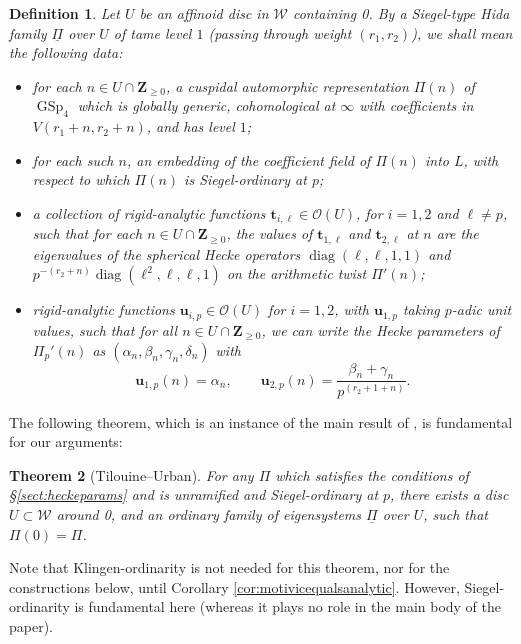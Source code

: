 \documentclass[cjm]{ipart}
\theoremstyle{plain}
\newtheorem{theorem}{Theorem}[subsection]
\newtheorem{definition}[theorem]{Definition}
\theoremstyle{remark}
\DeclareMathOperator{\diag}{diag}
\DeclareMathOperator{\GSp}{GSp}
\newcommand{\ZZ}{\mathbf{Z}}
\newcommand{\cO}{\mathcal{O}}
\newcommand{\cW}{\mathcal{W}}
\newcommand{\uPi}{\underline{\Pi}}
\numberwithin{equation}{subsection}
\renewcommand{\ge}{\geqslant}
\begin{document}
  \begin{definition}
   \label{def:family}
   Let $U$ be an affinoid disc in $\cW$ containing 0. By a \emph{Siegel-type Hida family} $\uPi$ over $U$ of tame level $1$ (passing through weight $(r_1, r_2)$), we shall mean the following data:
   \begin{itemize}
    \item for each $n \in U \cap \ZZ_{\ge 0}$, a cuspidal automorphic representation $\Pi(n)$ of $\GSp_4$ which is globally generic, cohomological at $\infty$ with coefficients in $V(r_1 + n, r_2 + n)$, and has level $1$;
    \item for each such $n$, an embedding of the coefficient field of $\Pi(n)$ into $L$, with respect to which $\Pi(n)$ is Siegel-ordinary at $p$;
    \item a collection of rigid-analytic functions $\mathbf{t}_{i, \ell} \in \cO(U)$, for $i = 1, 2$ and $\ell \ne p$, such that for each $n \in U \cap \ZZ_{\ge 0}$, the values of $\mathbf{t}_{1, \ell}$ and $\mathbf{t}_{2, \ell}$ at $n$ are the eigenvalues of the spherical Hecke operators $\diag(\ell, \ell, 1, 1)$ and $p^{-(r_2+n)} \diag(\ell^2, \ell, \ell, 1)$ on the arithmetic twist $\Pi'(n)$;
    \item rigid-analytic functions $\mathbf{u}_{i, p} \in \cO(U)$ for $i = 1, 2$, with $\mathbf{u}_{1, p}$ taking $p$-adic unit values, such that for all $n \in U \cap \ZZ_{\ge 0}$, we can write the Hecke parameters of $\Pi_p'(n)$ as $(\alpha_n, \beta_n, \gamma_n, \delta_n)$ with
    \[ \mathbf{u}_{1, p}(n) = \alpha_n, \qquad \mathbf{u}_{2, p}(n) = \frac{\beta_n + \gamma_n}{p^{(r_2 + 1+n)}}.\]
   \end{itemize}
  \end{definition}

  The following theorem, which is an instance of the main result of \cite{tilouineurban99}, is fundamental for our arguments:

  \begin{theorem}[Tilouine--Urban]
   \label{thm:tilouineurban}
   For any $\Pi$ which satisfies the conditions of \S \ref{sect:heckeparams} and is unramified and Siegel-ordinary at $p$, there exists a disc $U \subset \cW$ around 0, and an ordinary family of eigensystems $\uPi$ over $U$, such that $\Pi(0) = \Pi$.
  \end{theorem}
  
  \begin{remark}
   Note that Klingen-ordinarity is not needed for this theorem, nor for the constructions below, until Corollary \ref{cor:motivicequalsanalytic}. However, Siegel-ordinarity is fundamental here (whereas it plays no role in the main body of the paper).
  \end{remark}
\end{document}
